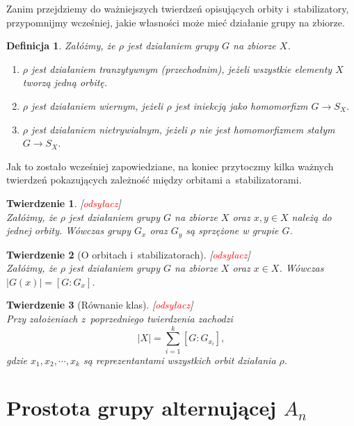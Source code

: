 \documentclass[licencjacka]{pracamgr}
\newtheorem{deff}{Definicja}[section]
\newtheorem{thh}{Twierdzenie}[section]
\begin{document}
Zanim przejdziemy do ważniejszych twierdzeń opisujących orbity
i~stabilizatory, przypomnijmy wcześniej, jakie własności może mieć
działanie grupy na zbiorze.

\begin{deff}
    Załóżmy, że $\rho$ jest działaniem grupy $G$ na zbiorze $X$.
    \begin{enumerate}[label=\alph*)]
     \item \emph{$\rho$ jest działaniem tranzytywnym (przechodnim)}, jeżeli wszystkie elementy $X$ tworzą jedną orbitę.
     \item \emph{$\rho$ jest działaniem wiernym}, jeżeli $\rho$ jest iniekcją jako homomorfizm $G \to S_X$.
     \item \emph{$\rho$ jest działaniem nietrywialnym}, jeżeli $\rho$ nie jest homomorfizmem stałym $G \to S_X$.
    \end{enumerate}
\end{deff}

Jak to zostało wcześniej zapowiedziane, na koniec przytoczmy kilka
ważnych twierdzeń pokazujących zależność między orbitami
a~stabilizatorami.

\begin{thh}\label{conj_stab} $ $[\textcolor{red}{odsyłacz}]\\
    Załóżmy, że $\rho$ jest działaniem grupy $G$ na zbiorze $X$ oraz $x, y \in X$ należą do jednej orbity.
    Wówczas grupy $G_x$ oraz $G_y$ są sprzężone w grupie $G$.
\end{thh}

\begin{thh}[O orbitach i~stabilizatorach] [\textcolor{red}{odsyłacz}]$ $\\
    Załóżmy, że $\rho$ jest działaniem grupy $G$ na zbiorze $X$ oraz $x\in X$.
    Wówczas $|G(x)| = [G : G_x]$.
\end{thh}

\begin{thh}[Równanie klas] [\textcolor{red}{odsyłacz}] $ $\\
    Przy założeniach z~poprzedniego twierdzenia zachodzi
    $$ |X| = \sum_{i=1}^k [G : G_{x_i}] ,$$
    gdzie $x_1, x_2, \cdots, x_k$ są reprezentantami wszystkich orbit działania $\rho$.
\end{thh}



\chapter{Prostota grupy alternującej $A_n$}
\end{document}
